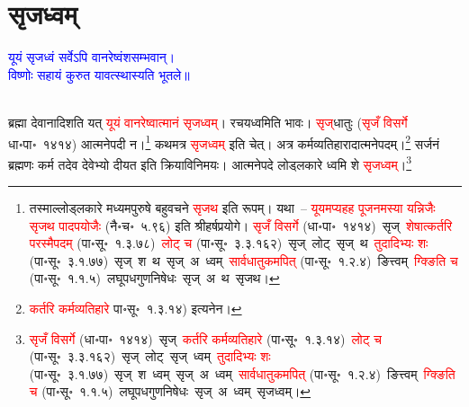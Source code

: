 \section[सृजध्वम्]{सृजध्वम्}
\centering\textcolor{blue}{यूयं सृजध्वं सर्वेऽपि वानरेष्वंशसम्भवान्।\nopagebreak\\
विष्णोः सहायं कुरुत यावत्स्थास्यति भूतले॥}\nopagebreak\\
\\
\fontsize{14}{21}\selectfont\begin{sloppypar}\justifying\noindent\hspace{10mm} ब्रह्मा देवानादिशति यत् \textcolor{red}{यूयं वानरेष्वात्मानं सृजध्वम्}। रचयध्वमिति भावः। \textcolor{red}{सृज्‌}\-धातुः (\textcolor{red}{सृजँ विसर्गे} धा॰पा॰~१४१४) आत्मने\-पदी न।\footnote{तस्माल्लोड्लकारे मध्यमपुरुषे बहुवचने \textcolor{red}{सृजथ} इति रूपम्। यथा~– \textcolor{red}{यूयमप्यहह पूजनमस्या यन्निजैः सृजथ पादपयोजैः} (नै॰च॰~५.९६) इति श्रीहर्षप्रयोगे। \textcolor{red}{सृजँ विसर्गे} (धा॰पा॰~१४१४)~\arrow सृज्~\arrow \textcolor{red}{शेषात्कर्तरि परस्मैपदम्} (पा॰सू॰~१.३.७८)~\arrow \textcolor{red}{लोट् च} (पा॰सू॰~३.३.१६२)~\arrow सृज्~लोट्~\arrow सृज्~थ~\arrow \textcolor{red}{तुदादिभ्यः शः} (पा॰सू॰~३.१.७७)~\arrow सृज्~श~थ~\arrow सृज्~अ~ध्वम्~\arrow \textcolor{red}{सार्वधातुकमपित्} (पा॰सू॰~१.२.४)~\arrow ङित्त्वम्~\arrow \textcolor{red}{ग्क्ङिति च} (पा॰सू॰~१.१.५)~\arrow लघूपध\-गुण\-निषेधः~\arrow सृज्~अ~थ~\arrow सृजथ।} कथमत्र \textcolor{red}{सृजध्वम्} इति चेत्। अत्र कर्म\-व्यतिहारादात्मने\-पदम्।\footnote{\textcolor{red}{कर्तरि कर्म\-व्यतिहारे} पा॰सू॰~१.३.१४) इत्यनेन।} सर्जनं ब्रह्मणः कर्म तदेव देवेभ्यो दीयत इति क्रिया\-विनिमयः। आत्मनेपदे लोड्लकारे ध्वमि शे \textcolor{red}{सृजध्वम्}।\footnote{\textcolor{red}{सृजँ विसर्गे} (धा॰पा॰~१४१४)~\arrow सृज्~\arrow \textcolor{red}{कर्तरि कर्म\-व्यतिहारे} (पा॰सू॰~१.३.१४)~\arrow \textcolor{red}{लोट् च} (पा॰सू॰~३.३.१६२)~\arrow सृज्~लोट्~\arrow सृज्~ध्वम्~\arrow \textcolor{red}{तुदादिभ्यः शः} (पा॰सू॰~३.१.७७)~\arrow सृज्~श~ध्वम्~\arrow सृज्~अ~ध्वम्~\arrow \textcolor{red}{सार्वधातुकमपित्} (पा॰सू॰~१.२.४)~\arrow ङित्त्वम्~\arrow \textcolor{red}{ग्क्ङिति च} (पा॰सू॰~१.१.५)~\arrow लघूपध\-गुण\-निषेधः~\arrow सृज्~अ~ध्वम्~\arrow सृजध्वम्।}\end{sloppypar}
